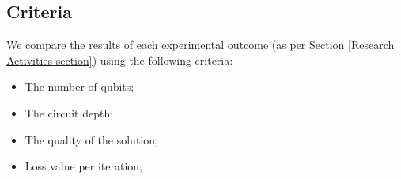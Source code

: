\subsection{Criteria}
\label{Criteria section}
We compare the results of each experimental outcome (as per Section \ref{Research Activities section}) using the following criteria:
\begin{itemize}
    \item The number of qubits;
    \item The circuit depth;
    \item The quality of the solution;
    \item Loss value per iteration;
\end{itemize}